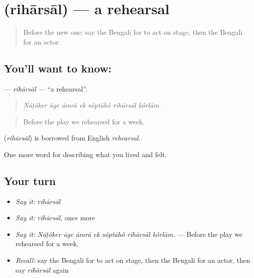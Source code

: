 \section[\texorpdfstring{\bn{রিহার্সাল} (rihārsāl)}{রিহার্সাল (rihārsāl)}]{ (rihārsāl) — a rehearsal}

\label{lesson:BN-C527-riharsal}



\begin{quote}
Before the new one: say the Bengali for to act on stage, then the Bengali for an actor.
\end{quote}

\subsection*{You'll want to know: }
\textbf{} — \emph{rihārsāl} — \textquotedblleft{}a rehearsal\textquotedblright{}.

\begin{quote}
      
\end{quote}

\begin{quote}
\emph{Nāṭôker āge āmrā ek sôptāhô rihārsāl kôrlām.}
\end{quote}

\begin{quote}
Before the play we rehearsed for a week.
\end{quote}

\begin{cousinweb}
\textbf{} (\emph{rihārsāl}) is borrowed from English \emph{rehearsal}.
\end{cousinweb}

\begin{grammarlens}[title={What you've built}]
One more word for describing what you lived and felt.
\end{grammarlens}

\subsection*{Your turn}
\begin{itemize}
\raggedright
  \item \emph{Say it:} \emph{rihārsāl}
  \item \emph{Say it:} \emph{rihārsāl}, once more
  \item \emph{Say it:} \emph{Nāṭôker āge āmrā ek sôptāhô rihārsāl kôrlām.} — Before the play we rehearsed for a week.
  \item \emph{Recall:} say the Bengali for to act on stage, then the Bengali for an actor, then say \emph{rihārsāl} again
\end{itemize}

